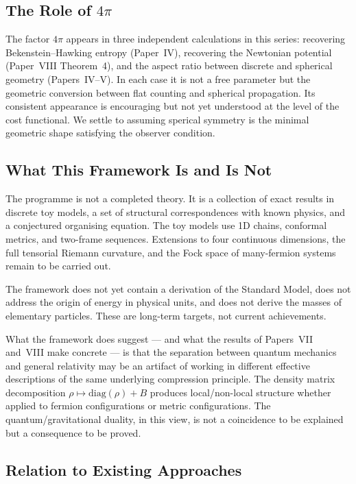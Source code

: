 \documentclass[11pt]{article}
\begin{document}
\subsection{The Role of $4\pi$}

The factor $4\pi$ appears in three independent calculations in this
series: recovering Bekenstein--Hawking entropy (Paper~IV), recovering
the Newtonian potential (Paper~VIII Theorem~4), and the aspect ratio
between discrete and spherical geometry (Papers~IV--V).
In each case it is not a free parameter but the geometric conversion
between flat counting and spherical propagation.
Its consistent appearance is encouraging but not yet understood at the
level of the cost functional. We settle to  assuming sperical symmetry is the minimal
geometric shape satisfying the observer condition.


\subsection{What This Framework Is and Is Not}

The programme is not a completed theory.
It is a collection of exact results in discrete toy models, a set of
structural correspondences with known physics, and a conjectured
organising equation.
The toy models use 1D chains, conformal metrics, and two-frame
sequences.
Extensions to four continuous dimensions, the full tensorial Riemann
curvature, and the Fock space of many-fermion systems remain to be
carried out.

The framework does not yet contain a derivation of the Standard Model,
does not address the origin of energy in physical units, and does not
derive the masses of elementary particles.
These are long-term targets, not current achievements.

What the framework does suggest --- and what the results of Papers~VII
and~VIII make concrete --- is that the separation between quantum
mechanics and general relativity may be an artifact of working in
different effective descriptions of the same underlying compression
principle.
The density matrix decomposition $\rho \mapsto \mathrm{diag}(\rho) + B$
produces local/non-local structure whether applied to fermion
configurations or metric configurations.
The quantum/gravitational duality, in this view, is not a coincidence
to be explained but a consequence to be proved.

\subsection{Relation to Existing Approaches}
\end{document}
